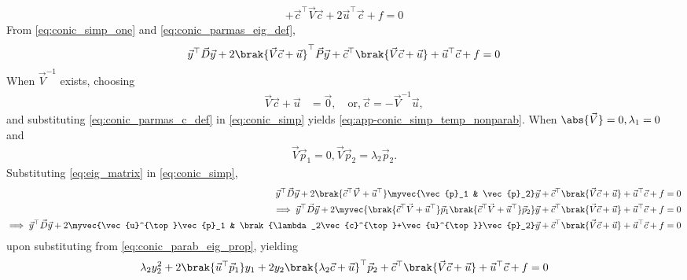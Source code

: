 \begin{enumerate}[label=\thesubsection.\arabic*.,ref=\thesubsection.\theenumi]
\begin{align}
+  \vec{c}^{\top}\vec{V}\vec{c} + 2\vec{u}^{\top}\vec{c} + f= 0
\label{eq:conic_simp_one}
\end{align}
%
From \eqref{eq:conic_simp_one} and \eqref{eq:conic_parmas_eig_def},
\begin{align}
\vec{y}^{\top}\vec{D}\vec{y}+2\brak{\vec{V}\vec{c}+\vec{u}}^{\top}\vec{P}\vec{y}
+  \vec{c}^{\top}\brak{\vec{V}\vec{c} + \vec{u}}+ \vec{u}^{\top}\vec{c} + f= 0
\label{eq:conic_simp}
\end{align}
When $\vec{V}^{-1}$ exists, choosing
\begin{align}
\vec{V}\vec{c}+\vec{u} &= \vec{0}, \quad \text{or}, \vec{c} = -\vec{V}^{-1}\vec{u},
\label{eq:conic_parmas_c_def}
\end{align}
%
and substituting \eqref{eq:conic_parmas_c_def}
in \eqref{eq:conic_simp}
yields \eqref{eq:app-conic_simp_temp_nonparab}. 
When $\abs{\vec{V}} = 0, \lambda_1 = 0$ and 
\begin{align}
\vec{V}\vec{p}_1 = 0, 
\vec{V}\vec{p}_2 = \lambda_2\vec{p}_2.
\label{eq:conic_parab_eig_prop} 
\end{align}
Substituting \eqref{eq:eig_matrix}
in \eqref{eq:conic_simp},
\begin{align*}
	\vec{y}^{\top}\vec{D}\vec{y}+2\brak{\vec{c}^{\top}\vec{V}+\vec{u}^{\top}}\myvec{\vec{p}_1 & \vec{p}_2}\vec{y}
	+  \vec{c}^{\top}\brak{\vec{V}\vec{c} + \vec{u}}+ \vec{u}^{\top}\vec{c} + f= 0
\\
\implies \vec{y}^{\top}\vec{D}\vec{y}
+2\myvec{\brak{\vec{c}^{\top}\vec{V}+\vec{u}^{\top}}\vec{p}_1  \brak{\vec{c}^{\top}\vec{V}+\vec{u}^{\top}}\vec{p}_2}\vec{y}
	+  \vec{c}^{\top}\brak{\vec{V}\vec{c} + \vec{u}}+ \vec{u}^{\top}\vec{c} + f= 0
\\
\implies \vec{y}^{\top}\vec{D}\vec{y}
+2\myvec{\vec{u}^{\top}\vec{p}_1 & \brak{\lambda_2\vec{c}^{\top}+\vec{u}^{\top}}\vec{p}_2}\vec{y}
	+  \vec{c}^{\top}\brak{\vec{V}\vec{c} + \vec{u}}+ \vec{u}^{\top}\vec{c} + f= 0
\end{align*}
upon substituting from 
 \eqref{eq:conic_parab_eig_prop}, yielding
\begin{multline}
\lambda_2y_2^2+2\brak{\vec{u}^{\top}\vec{p}_1}y_1+  2y_2\brak{\lambda_2\vec{c}+\vec{u}}^{\top}\vec{p}_2
	+  \vec{c}^{\top}\brak{\vec{V}\vec{c} + \vec{u}}+ \vec{u}^{\top}\vec{c} + f= 0

\end{multline}
\end{enumerate}
